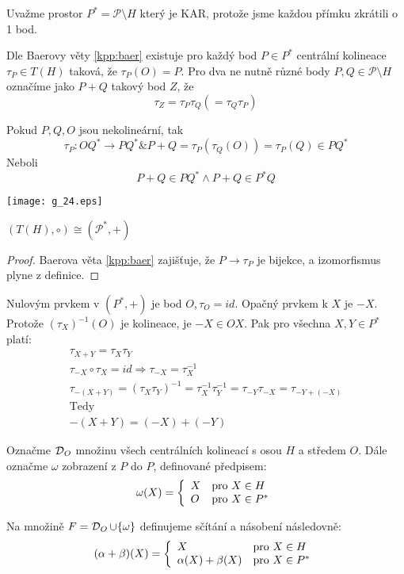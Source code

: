 \begin{definition}\label{kpp:sum_operation}
	Uvažme prostor $P^* = \mathcal{P}\setminus H$ který je KAR, protože jsme každou přímku zkrátili o 1 bod.

    Dle Baerovy věty \cref{kpp:baer} existuje pro každý bod $P \in P^*$ centrální kolineace $\tau_P\in T(H)$ taková, že $\tau_P(O)=P$.
    Pro dva ne nutně různé body $P,Q\in\mathcal{P}\setminus H$ označíme jako $P+Q$ takový bod $Z$, že
    \[ \tau_Z=\tau_P\tau_Q(=\tau_Q\tau_P) \]
\end{definition}

\begin{observation}
	Pokud $P, Q, O$ jsou nekolineární, tak
	\[ \tau_P: OQ^* \to PQ^* \& P + Q = \tau_P (\tau_Q(O)) = \tau_P(Q) \in PQ^* \]
	Neboli
	\[ P + Q \in PQ^* \land P + Q \in P^*Q \]

    \texttt{[image: g\_24.eps]}
\end{observation}

\begin{theorem}
    $(T(H),\circ)\cong(\mathcal{P}^*,+)$
\end{theorem}
\begin{proof}
    Baerova věta \cref{kpp:baer} zajišťuje, že $P\rightarrow \tau_P$ je bijekce, a izomorfismus plyne z definice.
\end{proof}

\begin{note}
	Nulovým prvkem v $(P^*, +)$ je bod $O, \tau_O = id$.
	Opačný prvkem k $X$ je $-X$.
	Protože $(\tau_X)^{-1}(O)$ je kolineace, je $-X \in OX$.
	Pak pro všechna $X, Y \in P^*$ platí:
	\begin{gather*}
		\tau_{X + Y} = \tau_X \tau_Y\\
    		\tau_{-X} \circ \tau_X = id \Rightarrow \tau_{-X} = \tau_X^{-1}\\
		\tau_{-(X + Y)} = (\tau_X \tau_Y)^{-1} = \tau_X^{-1} \tau_Y^{-1} = \tau_{-Y}\tau_{-X} = \tau_{-Y + (-X)}\\
		\text{Tedy}\\
		-(X + Y) = (-X) + (-Y)
	\end{gather*}
\end{note}

\begin{definition}
    Označme $\operatorname{\mathcal{D}}_O$ množinu všech centrálních kolineací s osou $H$ a středem $O$.
    Dále označme $\omega$ zobrazení z $P$ do $P$, definované předpisem:
    \[ \omega(X) = \left\{ \begin{array}{ll} X & \mbox{pro } X \in H \\ O & \mbox{pro } X \in P^* \end{array} \right. \]

    Na množině $F=\operatorname{\mathcal{D}}_O\cup\{\omega\}$ definujeme sčítání a násobení následovně:
    \[ (\alpha+\beta)(X) = \left\{ \begin{array}{ll} X & \mbox{pro } X \in H \\ \alpha(X)+\beta(X) & \mbox{pro } X \in P^* \end{array} \right. \]
\end{definition}


